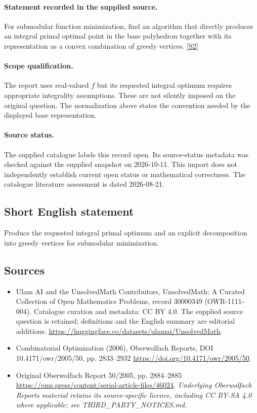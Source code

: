 \documentclass[11pt]{article}
\begin{document}
\paragraph{Statement recorded in the supplied source.}
For submodular function minimization, find an algorithm that directly produces an integral primal optimal point in the base polyhedron together with its representation as a convex combination of greedy vertices. \href{https://doi.org/10.4171/owr/2005/50}{[S2]}
\paragraph{Scope qualification.}
The report uses real-valued $f$ but its requested integral optimum requires appropriate integrality assumptions. These are not silently imposed on the original question. The normalization above states the convention needed by the displayed base representation.
\paragraph{Source status.}
The supplied catalogue labels this record open. Its source-status metadata was checked against the supplied snapshot on 2026-10-11. This import does not independently establish current open status or mathematical correctness. The catalogue literature assessment is dated 2026-08-21.
\subsection{Short English statement}
Produce the requested integral primal optimum and an explicit decomposition into greedy vertices for submodular minimization.
\subsection{Sources}
\begin{itemize}
\item[S1] Ulam AI and the UnsolvedMath Contributors, UnsolvedMath: A Curated Collection of Open Mathematics Problems, record 30000349 (OWR-1111-004). Catalogue curation and metadata: CC BY 4.0. The supplied source question is retained; definitions and the English summary are editorial additions.
\url{https://huggingface.co/datasets/ulamai/UnsolvedMath}.
\item[S2] Combinatorial Optimization (2006), Oberwolfach Reports, DOI 10.4171/owr/2005/50, pp. 2833--2932
\url{https://doi.org/10.4171/owr/2005/50}.
\item[S3] Original Oberwolfach Report 50/2005, pp. 2884--2885
\url{https://ems.press/content/serial-article-files/46024}.
\textit{Underlying Oberwolfach Reports material retains its source-specific licence, including CC BY-SA 4.0 where applicable; see THIRD\_PARTY\_NOTICES.md.}
\end{itemize}
\end{document}
